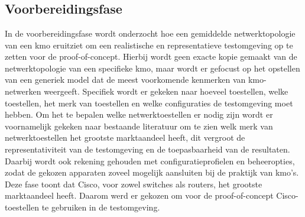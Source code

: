 
\chapter{}%
\label{ch:methodologie}


\section{Voorbereidingsfase}
In de voorbereidingsfase wordt onderzocht hoe een gemiddelde netwerktopologie van een kmo eruitziet om een realistische en representatieve testomgeving op te zetten voor de proof-of-concept.
Hierbij wordt geen exacte kopie gemaakt van de netwerktopologie van een specifieke kmo, maar wordt er gefocust op het opstellen van een generiek model dat de meest voorkomende kenmerken van kmo-netwerken weergeeft.
Specifiek wordt er gekeken naar hoeveel toestellen, welke toestellen, het merk van toestellen en welke configuraties de testomgeving moet hebben.
Om het te bepalen welke netwerktoestellen er nodig zijn wordt er voornamelijk gekeken naar bestaande literatuur om te zien welk merk van netwerktoestellen het grootste marktaandeel heeft, dit vergroot de representativiteit van de testomgeving en de toepasbaarheid van de resultaten. 
Daarbij wordt ook rekening gehouden met configuratieprofielen en beheeropties, zodat de gekozen apparaten zoveel mogelijk aansluiten bij de praktijk van kmo's.
Deze fase toont dat Cisco, voor zowel switches als routers, het grootste marktaandeel heeft. Daarom werd er gekozen om voor de proof-of-concept Cisco-toestellen te gebruiken in de testomgeving.

